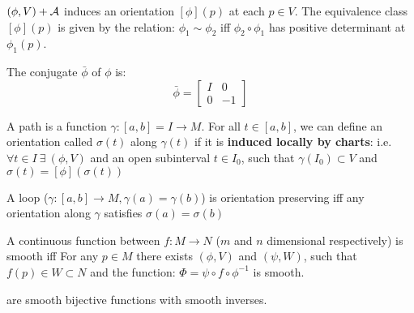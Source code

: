 \documentclass{beamer}
\begin{document}
\begin{frame}
\begin{ddef}
$(\phi,V) + \mathcal{A}$ induces an orientation $[\phi](p)$ at each $p\in V$. The equivalence class $[\phi](p)$ is given by the relation: $\phi_1 \sim \phi_2$ iff $\phi_2 \circ \phi_1$ has positive determinant at $\phi_1(p)$.
\end{ddef}
\begin{ddef}
The conjugate $\bar \phi$ of $\phi$ is: $$\bar \phi = \begin{bmatrix} I & 0 \\ 0 & -1 \end{bmatrix}$$ 
\end{ddef}
\begin{ddef}[Paths]
A path is a function $\gamma: [a,b] =I \to M$. For all $t\in [a,b]$, we can define an orientation called $\sigma(t)$ 
along $\gamma(t)$ if it is \textbf{induced locally by charts}: i.e.  $\forall t\in I \ \exists \ (\phi,V)$ and an open subinterval $t\in I_0$, such that $\gamma(I_0)\subset V$ and $\sigma(t)=[\phi](\sigma(t))$    
\end{ddef}
\begin{ddef}
A loop ($\gamma:[a,b]\to M, \gamma(a) = \gamma(b)$) is orientation preserving iff any orientation along $\gamma$ satisfies $\sigma(a)=\sigma(b)$
\end{ddef}
\begin{ddef}
A continuous function between $f: M \to N$ ($m$ and $n$ dimensional respectively) is smooth iff For any $p\in M$ there exists $(\phi,V)$ and $(\psi,W)$, such that $f(p)\in W\subset N$ and the function: $ \Phi = \psi \circ f \circ \phi^{-1} $ is smooth.
\end{ddef}
\begin{ddef}[Diffeomorphims] 
are smooth bijective functions with smooth inverses.
\end{ddef}
\end{frame}
\end{document}
